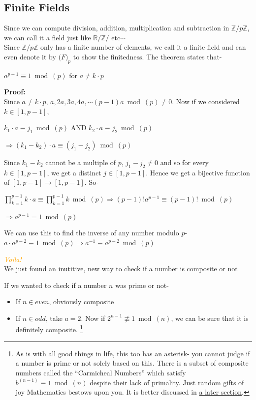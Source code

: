 	 	\subsection{Finite Fields}
	 		Since we can compute division, addition, multiplication and subtraction in \(\mathbb{Z}/p\mathbb{Z}\), we can call it a field just like \(\mathbb{R}/\mathbb{Z}/\) etc\(\cdots\) \\
	 		Since \(\mathbb{Z}/p\mathbb{Z}\) only has a finite number of elements, we call it a finite field and can even denote it by \(\mathbb(F)_p\) to show the finitedness.
	 \label{sec:fermat}
	 	The theorem states that- \par
	 	\centering \(a^{p-1} \equiv 1 \bmod(p)\) for \(a \not = k \cdot p\) \par
	 	\begin{mdframed}
		 	\raggedright \textbf{Proof:} \\
		 	Since \(a \not= k \cdot p\), \(a, 2a, 3a, 4a, \cdots (p-1)a \bmod(p) \not= 0\). Now if we considered \(k \in [1,p-1]\), \par
		 	\centering \(k_1 \cdot a \equiv j_1 \bmod(p)\) AND \(k_2 \cdot a \equiv j_2 \bmod(p)\) \par
		 	\(\Rightarrow (k_1-k_2)\cdot a \equiv (j_1-j_2) \bmod(p)\) \par
		 	\raggedright Since \(k_1 - k_2\) cannot be a multiple of \(p\), \(j_1 - j_2 \not= 0\) and so for every \(k \in [1, p-1]\), we get a distinct \(j \in [1, p-1]\). Hence we get a bijective function of \([1,p-1] \rightarrow [1,p-1]\). So- \par
		 	\centering \( \prod_{k=1}^{p-1}k \cdot a \equiv  \prod_{k=1}^{p-1}{k} \bmod(p) \Rightarrow (p-1)! a^{p-1} \equiv (p-1)! \bmod(p)\) \par
		 	\(\Rightarrow a^{p-1}=1 \bmod(p)\)
	 	\end{mdframed}
	 	\raggedright We can use this to find the inverse of any number modulo \(p\)- \\ \centering \(a\cdot a^{p-2}\equiv 1 \bmod(p) \Rightarrow a^{-1} \equiv a^{p-2} \bmod(p)\) \par \par  
	 	\LARGE \emph{\textcolor{orange}{Voila!}}  \\ \tiny We just found an inutitive, new way to check if a number is composite or not \par
	 	\raggedright \small If we wanted to check if a number \(n\) was prime or not-
	 	\begin{itemize}
	 		\item If \(n \in even\), obviously composite
	 		\item If \(n\in odd\), take \(a=2\). Now if \(2^{n-1} \not \equiv 1 \bmod(n)\), we can be sure that it is definitely composite. \footnote{As is with all good things in life, this too has an asterisk- you cannot judge if a number is prime or not solely based on this. There is a subset of composite numbers called the ``Carmicheal Numbers'' which satisfy \(b^{(n-1)} \equiv 1 \bmod(n)\) despite their lack of primality. Just random gifts of joy Mathematics bestows upon you. It is better discussed in \hyperref[subsec:witness]{a later section}.} \\
	 	\end{itemize}
